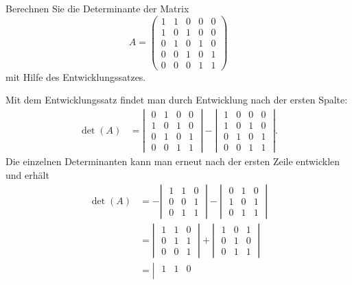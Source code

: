 Berechnen Sie die Determinante der Matrix
\[
A=
\begin{pmatrix}
1&1&0&0&0\\
1&0&1&0&0\\
0&1&0&1&0\\
0&0&1&0&1\\
0&0&0&1&1
\end{pmatrix}
\]
mit Hilfe des Entwicklungssatzes.


\begin{loesung}
Mit dem Entwicklungssatz findet man durch Entwicklung nach der
ersten Spalte:
\begin{align*}
\det(A)
&=
\left|\;
\begin{matrix}
0&1&0&0\\
1&0&1&0\\
0&1&0&1\\
0&0&1&1
\end{matrix}
\;\right|
-
\left|\;
\begin{matrix}
1&0&0&0\\
1&0&1&0\\
0&1&0&1\\
0&0&1&1
\end{matrix}
\;\right|.
\end{align*}
Die einzelnen Determinanten kann man erneut nach der ersten Zeile
entwicklen und erhält
\begin{align*}
\det(A)
&=
-\left|\;
\begin{matrix}
1&1&0\\
0&0&1\\
0&1&1
\end{matrix}
\;\right|
-
\left|\;
\begin{matrix}
0&1&0\\
1&0&1\\
0&1&1
\end{matrix}
\;\right|
\\
&=
\left|\;
\begin{matrix}
1&1&0\\
0&1&1\\
0&0&1
\end{matrix}
\;\right|
+
\left|\;
\begin{matrix}
1&0&1\\
0&1&0\\
0&1&1
\end{matrix}
\;\right|
\\
&=
\left|\;
\begin{matrix}
1&1&0\\

\end{matrix}
\end{align*}
\end{loesung}
